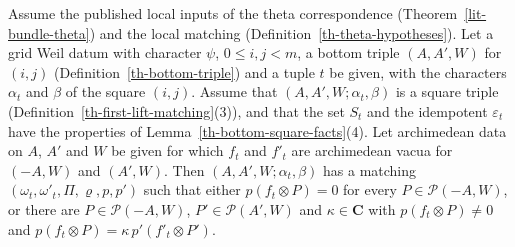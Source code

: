 \begin{lemma}\label{th-bottom-split-matching}
Assume the published local inputs of the theta correspondence
(Theorem~\ref{lit-bundle-theta}) and the local matching
(Definition~\ref{th-theta-hypotheses}). Let a grid Weil datum with character
$\psi$, $0\leq i,j<m$, a bottom triple $(A,A',W)$ for $(i,j)$
(Definition~\ref{th-bottom-triple}) and a tuple $t$ be given, with the
characters $\alpha_t$ and $\beta$ of the square $(i,j)$. Assume that
$(A,A',W;\alpha_t,\beta)$ is a square triple
(Definition~\ref{th-first-lift-matching}(3)), and that the set $S_t$ and the
idempotent $\varepsilon_t$ have the properties of
Lemma~\ref{th-bottom-square-facts}(4). Let archimedean data on $A$, $A'$ and
$W$ be given for which $f_t$ and $f'_t$ are archimedean vacua for $(-A,W)$ and
$(A',W)$. Then $(A,A',W;\alpha_t,\beta)$ has a matching
$(\omega_t,\omega'_t,\Pi,\varrho,p,p')$ such that either $p(f_t\otimes P)=0$
for every $P\in\mathcal P(-A,W)$, or there are $P\in\mathcal P(-A,W)$,
$P'\in\mathcal P(A',W)$ and $\kappa\in\mathbf C$ with
$p(f_t\otimes P)\neq0$ and $p(f_t\otimes P)=\kappa\,p'(f'_t\otimes P')$.
\end{lemma}
